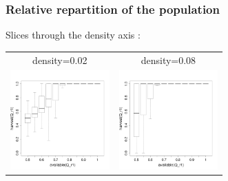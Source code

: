 \documentclass[8pt, handout=show,notes=show]{beamer}
\begin{document}
\subsubsection{Relative repartition of the population}
\begin{frame}{ Slices through the density axis : }

	\renewcommand{\imgSize}{3.8cm}	
	\begin{table}[H]

		\centering
		\begin{tabular}{cc}
			density=0.02&density=0.08\\
			\includegraphics[width=\imgSize]{images/harvestr1_r1_density-2.png}&
			\includegraphics[width=\imgSize]{images/harvestr1_r1_density-8.png}\\

\end{tabular}
\end{table}
\end{frame}
\end{document}
